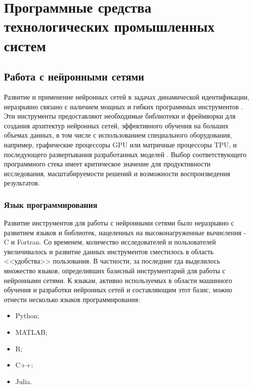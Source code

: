 \chapter{Программные средства технологических промышленных систем}



\section{Работа с нейронными сетями}

Развитие и применение нейронных сетей в задачах динамической идентификации,
неразрывно связано с наличием мощных и гибких программных инструментов
\cite{bib:gui:ml}. Эти инструменты предоставляют необходимые библиотеки и
фреймворки для создания архитектур нейронных сетей, эффективного обучения на
больших объемах данных, в том числе с использованием специального оборудования,
например, графические процессоры GPU или матричные процессоры TPU, и
последующего развертывания разработанных моделей \cite{bib:tools:ml}. Выбор
соответствующего программного стека имеет критическое значение для
продуктивности исследования, масштабируемости решений и возможности
воспроизведения результатов.

\subsection{Язык программирования}

Развитие инструментов для работы с нейронными сетями было неразрывно с развитием
языков и библиотек, нацеленных на высоконагруженные вычисления - C и Fortran. Со
временем, количество исследователей и пользователей увеличивалось и развитие
данных инструментов сместилось в область <<удобства>> пользования. В частности,
за последние гда выделилось множество языков, определивших базисный
инструментарий для работы с нейронными сетями. К языкам, активно используемых в
области машинного обучения и разработки нейронных сетей и составляющим этот
базис, можно отнести несколько языков программирования:

\begin{itemize}
  \item Python;
  \item MATLAB;
  \item R;
  \item C++;
  \item Julia.
\end{itemize}

